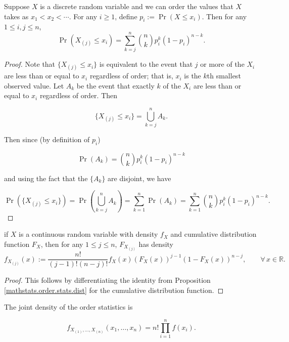 \begin{proposition}\label{mathstats.order.stats.dist} Suppose $X$ is a discrete random variable and we can order the values that $X$ takes as $x_{1}<x_{2}<\cdots$.  For any $i\geq1$, define $p_{i}:= \Pr(X\leq x_{i})$. Then for any $1\leq i,j\leq n$,
$$\Pr(X_{(j)}\leq x_{i})=\sum_{k=j}^{n}\binom{n}{k}p_{i}^{k}(1-p_{i})^{n-k}.$$
\end{proposition}

\begin{proof} Note that \(\{X_{(j)} \leq x_i\}\) is equivalent to the event that \(j\) or more of the \(X_i\) are less than or equal to \(x_i\) regardless of order; that is, \(x_i\) is the \(k\)th smallest observed value. Let \(A_k\) be the event that exactly \(k\) of the \(X_i\) are less than or equal to \(x_i\) regardless of order. Then

\[
\{X_{(j)} \leq x_i\} = \bigcup_{k=j}^n A_k.
\]

Then since (by definition of \(p_i\))

\[
\Pr(A_k) = \binom{n}{k} p_i^k(1-p_i)^{n-k}
\]

and using the fact that the \(\{A_k\}\) are disjoint, we have

\[
\Pr(\{X_{(j)} \leq x_i\}) = \Pr(\bigcup_{k=j}^n A_k) = \sum_{k=1}^n \Pr(A_k) = \sum_{k=1}^n \binom{n}{k} p_i^k(1-p_i)^{n-k}.
\]

\end{proof}

\begin{corollary}\label{mathstats.order.stats.density.541a} if $X$ is a continuous random variable with density $f_{X}$ and cumulative distribution function $F_{X}$, then for any $1\leq j\leq n$, $F_{X_{(j)}}$ has density
$$f_{X_{(j)}}(x):=\frac{n!}{(j-1)!(n-j)!}f_{X}(x)(F_{X}(x))^{j-1}(1-F_{X}(x))^{n-j},\qquad\forall\,x\in\mathbb{R}.$$

\end{corollary}

\begin{proof} This follows by differentiating the identity from Proposition \ref{mathstats.order.stats.dist} for the cumulative distribution function.

\end{proof}

\begin{proposition}\label{mathstats.order.stats.density} The joint density of the order statistics is

\[
f_{X_{(1)}, \ldots, X_{(n)}}(x_1, \ldots, x_n) = n! \prod_{i=1}^n f(x_i).
\]

\end{proposition}

